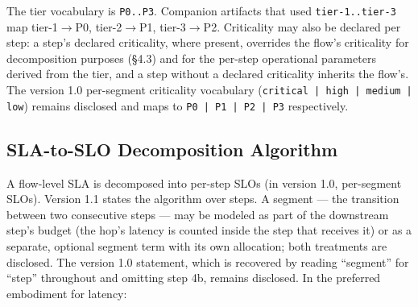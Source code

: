 \documentclass[11pt]{article}
\newcommand{\code}[1]{\texttt{#1}}
\begin{document}
The tier vocabulary is \code{P0..P3}. Companion artifacts that used \code{tier-1..tier-3} map tier-1\(\rightarrow\)P0, tier-2\(\rightarrow\)P1, tier-3\(\rightarrow\)P2. Criticality may also be declared per step: a step's declared criticality, where present, overrides the flow's criticality for decomposition purposes (\S4.3) and for the per-step operational parameters derived from the tier, and a step without a declared criticality inherits the flow's. The version 1.0 per-segment criticality vocabulary (\code{critical | high | medium | low}) remains disclosed and maps to \code{P0 | P1 | P2 | P3} respectively.

\subsection{SLA-to-SLO Decomposition Algorithm}
A flow-level SLA is decomposed into per-step SLOs (in version 1.0, per-segment SLOs). Version 1.1 states the algorithm over steps. A segment --- the transition between two consecutive steps --- may be modeled as part of the downstream step's budget (the hop's latency is counted inside the step that receives it) or as a separate, optional segment term with its own allocation; both treatments are disclosed. The version 1.0 statement, which is recovered by reading ``segment'' for ``step'' throughout and omitting step 4b, remains disclosed. In the preferred embodiment for latency:
\end{document}
